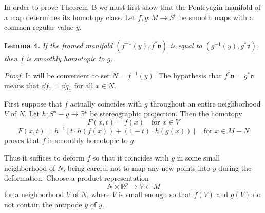 In order to prove Theorem~B we must first show that the Pontryagin manifold of a map determines its homotopy class. Let $f, g : M \to S^p$ be smooth maps with a common regular value $y$.

\noindent\textbf{Lemma 4.} \textit{If the framed manifold $(f^{-1}(y), f^*\mathfrak{v})$ is equal to $(g^{-1}(y), g^*\mathfrak{v})$, then $f$ is smoothly homotopic to $g$.}

\noindent\textit{Proof.}
It will be convenient to set $N = f^{-1}(y)$. The hypothesis that $f^*\mathfrak{v} = g^*\mathfrak{v}$ means that $\dd f_x = \dd g_x$ for all $x \in N$.

First suppose that $f$ actually coincides with $g$ throughout an entire neighborhood $V$ of $N$. Let $h : S^p - y \to \mathbb{R}^p$ be stereographic projection. Then the homotopy
\[
F(x, t) = f(x) \quad \text{for } x \in V
\]
\[
F(x, t) = h^{-1}[t \cdot h(f(x)) + (1 - t) \cdot h(g(x))] \quad \text{for } x \in M - N
\]
proves that $f$ is smoothly homotopic to $g$.

Thus it suffices to deform $f$ so that it coincides with $g$ in some small neighborhood of $N$, being careful not to map any new points into $y$ during the deformation. Choose a product representation
\[
N \times \mathbb{R}^p \to V \subset M
\]
for a neighborhood $V$ of $N$, where $V$ is small enough so that $f(V)$ and $g(V)$ do not contain the antipode $\bar{y}$ of $y$.

